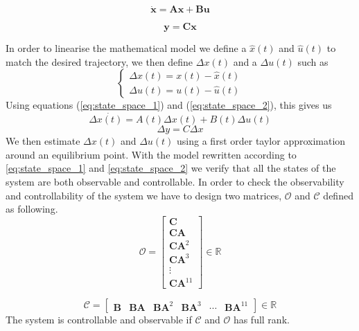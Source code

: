 \documentclass[journal]{IEEEtran}
\begin{document}
	\begin{equation} \label{eq:state_space_1}
			\bm{\dot x} = \bm{A} \bm{x} + \bm{B} \bm{u}
	\end{equation}
	
	\begin{equation} \label{eq:state_space_2}
	\bm{y} = \bm{C} \bm{x}
	\end{equation}	
	
In order to linearise the mathematical model we define a $\hat{x}(t)$ and $\hat{u}(t)$ to match the desired trajectory, we then define $\Delta x(t)$ and a $\Delta u(t)$ such as
\begin{equation} \label{eq:linearisation}
	\left\lbrace {\begin{array}{c}	
	\Delta x(t) = x(t) - \hat{x}(t) \\
	 \Delta u(t) = u(t) - \hat{u}(t)
	\end{array} }\right.
\end{equation}	 
Using equations (\ref{eq:state_space_1}) and (\ref{eq:state_space_2}), this gives us
\begin{equation} \label{eq:linerstate}
	\Delta \dot{x(t)} = A(t) \Delta x(t) + B(t) \Delta u(t)
\end{equation}	
	\begin{equation} \label{eq:linearstate_2}
		\Delta y = C \Delta x
	\end{equation}
	We then estimate $\Delta x(t)$ and $\Delta u(t)$ using a first order taylor approximation around an equilibrium point.
	With the model rewritten according to \ref{eq:state_space_1} and \ref{eq:state_space_2} we verify that all the states of the system are both observable and controllable. In order to check the observability and controllability of the system we have to design two matrices, $\mathcal{O}$ and $\mathcal{C}$ defined as following.
	\begin{equation}\label{eq:observability}
	\mathcal{O} = 
	\left[ {\begin{array}{c}	
    \bm{C}\\
    \bm{CA}\\
    \bm{CA}^2\\
    \bm{CA}^3\\
    \vdots \\
    \bm{CA}^{11}
	\end{array} } \right] \in 
	\mathbb{R}
	\end{equation}
	
	
	\begin{equation}\label{eq:controlability}
	\mathcal{C} = \left[ {\begin{array}{cccccc}	
    \bm{B} & \bm{BA} & \bm{BA}^2 & \bm{BA}^3 & \cdots & \bm{BA}^{11}
	\end{array} } \right] \in 
	\mathbb{R}
	\end{equation}
The system is controllable and observable if $\mathcal{C}$ and $\mathcal{O}$ has full rank.\\
	
\end{document}
